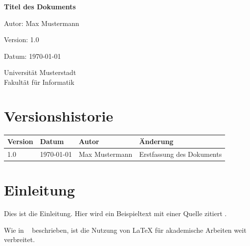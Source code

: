 \documentclass[a4paper,12pt]{article}
\begin{document}
\begin{titlepage}
    \centering
    {\Huge \textbf{Titel des Dokuments}\par}
    \vspace{2cm}
    {\Large Autor: Max Mustermann\par}
    {\large Version: 1.0\par}
    {\large Datum: \today\par}
    \vfill
    {\large Universität Musterstadt \\ Fakultät für Informatik}
\end{titlepage}

\section*{Versionshistorie}
\begin{tabular}{lllp{8cm}}
\toprule
\textbf{Version} & \textbf{Datum} & \textbf{Autor} & \textbf{Änderung} \\
\midrule
1.0 & \today & Max Mustermann & Erstfassung des Dokuments \\
\bottomrule
\end{tabular}
\newpage

\begin{abstract}
This document demonstrates how to create a professional LaTeX structure in VS Code. 
It includes examples for title pages, figures, tables, references, quotations, and automatic lists.
\end{abstract}
\newpage

\tableofcontents
\newpage
\listoffigures
\newpage
\listoftables
\newpage


\section{Einleitung}
Dies ist die Einleitung. Hier wird ein Beispieltext mit einer Quelle zitiert \cite{ieee_example}. 

Wie in ~\cite{ieee_example} beschrieben, 
ist die Nutzung von \LaTeX{} für akademische Arbeiten weit verbreitet.
\end{document}
